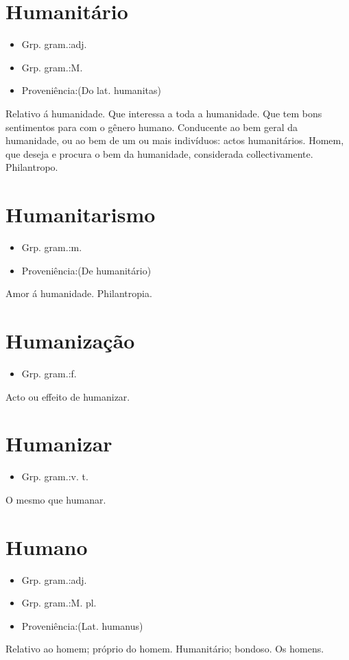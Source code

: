 \documentclass{article}
\begin{document}
\section{Humanitário}
\begin{itemize}
\item {Grp. gram.:adj.}
\end{itemize}
\begin{itemize}
\item {Grp. gram.:M.}
\end{itemize}
\begin{itemize}
\item {Proveniência:(Do lat. \textunderscore humanitas\textunderscore )}
\end{itemize}
Relativo á humanidade.
Que interessa a toda a humanidade.
Que tem bons sentimentos para com o gênero humano.
Conducente ao bem geral da humanidade, ou ao bem de um ou mais indivíduos: \textunderscore actos humanitários\textunderscore .
Homem, que deseja e procura o bem da humanidade, considerada collectivamente.
Philantropo.
\section{Humanitarismo}
\begin{itemize}
\item {Grp. gram.:m.}
\end{itemize}
\begin{itemize}
\item {Proveniência:(De \textunderscore humanitário\textunderscore )}
\end{itemize}
Amor á humanidade.
Philantropia.
\section{Humanização}
\begin{itemize}
\item {Grp. gram.:f.}
\end{itemize}
Acto ou effeito de humanizar.
\section{Humanizar}
\begin{itemize}
\item {Grp. gram.:v. t.}
\end{itemize}
O mesmo que \textunderscore humanar\textunderscore .
\section{Humano}
\begin{itemize}
\item {Grp. gram.:adj.}
\end{itemize}
\begin{itemize}
\item {Grp. gram.:M. pl.}
\end{itemize}
\begin{itemize}
\item {Proveniência:(Lat. \textunderscore humanus\textunderscore )}
\end{itemize}
Relativo ao homem; próprio do homem.
Humanitário; bondoso.
Os homens.
\end{document}
